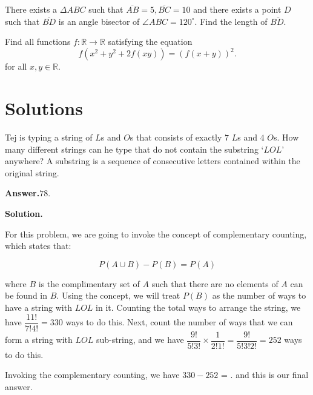 \documentclass[12pt,paper=letter]{scrartcl}
\newcommand{\ans}[1]{{\sffamily \bfseries Answer.}\;\(\boxed{\text{#1}}\).}
\newcommand{\sol}{{\sffamily \bfseries Solution.}\;}
\begin{document}
\begin{problem}
There exists a $\Delta ABC$ such that $\overline{AB}=5, \overline{BC} =10$ and there exists a point $D$ such that $\overline{BD}$ is an angle bisector of $\angle ABC = 120^{\circ}$. Find the length of $\overline{BD.}$
\end{problem}

\begin{problem}
Find all functions $f:\mathbb{R} \to \mathbb{R}$ satisfying the equation\[
	f(x^2+y^2+2f(xy)) = (f(x+y))^2.
\]for all $x,y \in \mathbb{R}$.
\end{problem}



\newpage

\section*{Solutions}

\vspace{2mm}

\begin{probboxed}
Tej is typing a string of $L$s and $O$s that consists of exactly $7$ $L$s and $4$ $O$s. How many different strings can he type that do not contain the substring ‘$LOL$’ anywhere? A substring is a sequence of consecutive letters contained within the original string.
\end{probboxed}

\ans{78}

\sol

For this problem, we are going to invoke the concept of complementary counting, which states that:

$$P(A \cup B) - P(B) = P(A)$$

where $B$ is the complimentary set of $A$ such that there are no elements of $A$ can be found in $B$. Using the concept, we will treat $P(B)$ as the number of ways to have a string with $LOL$ in it. Counting the total ways to arrange the string, we have $\dfrac{11!}{7!4!} = 330$ ways to do this. Next, count the number of ways that we can form a string with $LOL$ sub-string, and we have $\dfrac{9!}{5!3!} \times \dfrac{1}{2!1!} = \dfrac{9!}{5!3!2!} = 252$ ways to do this. 

\vspace{2mm}

Invoking the complementary counting, we have $330-252$ = . and this is our final answer.
\end{document}
